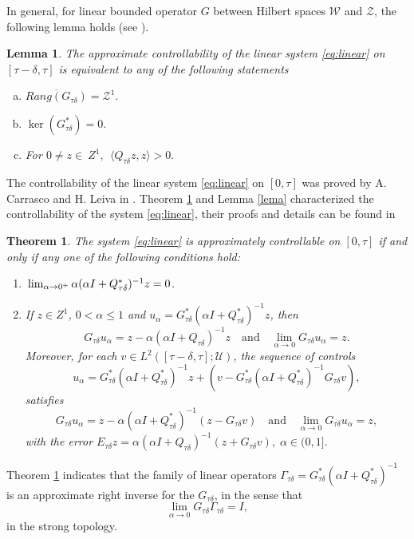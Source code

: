 \documentclass[11 pt]{amsart}
\newtheorem{teo}{\sc Theorem}[section]
\newtheorem{lemma}{\sc Lemma}[section]
\begin{document}
In general, for linear bounded operator $G$ between Hilbert spaces $\mathcal{W}$ and $\mathcal{Z}$, the following lemma holds (see \cite{Bashirov-Kerimov:1997aa,Bashirov-Mahmudov:1999aa, Leiva-Merentes:2013aa}).
\begin{lemma}
The approximate controllability of the linear system \eqref{eq:linear}  on $[\tau-\delta,\tau]$ is equivalent to  any of the following statements
\begin{enumerate}[(a)]
\item $\overline{Rang(G_{\tau\delta})}={\mathcal{Z}}^{1}.$
\item $\ker(G_{\tau\delta}^{*})={0}.$
\item For $0\neq z \in\ Z^{1},  \  \ {\langle { Q_{\tau\delta}z,z}\rangle}>0.$
\end{enumerate}
\end{lemma}

 The controllability of the linear system \eqref{eq:linear} on $[0,\tau]$ was proved  by A. Carrasco and H. Leiva in \cite{Carrasco-Leiva:2013aa}.  Theorem \ref{A1.5}   and Lemma \ref{lema} characterized the controllability of the system \eqref{eq:linear}, their proofs and details can be found in \cite{Bashirov-Kerimov:1997aa,Bashirov-Mahmudov:1999aa, Curtain-Pritchard:1978aa, Curtain-Zwart:1995aa, Leiva-Merentes:2013aa}

 \begin{teo}\label{A1.5} The system \eqref{eq:linear} is approximately
controllable on $[0,\tau]$ if and only if any one of the following conditions hold:
\begin{enumerate}
\item ${\displaystyle}\lim_{\alpha \to 0^+} \alpha(\alpha I +Q_{\tau\delta}^{*})^{-1}z =0 $.\\
\item If $z\in Z^{1}$,  $0<\alpha \leq 1$ and $u_{\alpha}=G_{\tau\delta}^{*}(\alpha I +
Q_{\tau\delta}^{*})^{-1}z$, then
$$
G_{\tau\delta}u_{\alpha}=z - \alpha(\alpha I+ Q_{\tau\delta})^{-1}z \quad \mbox{and} \quad
\displaystyle\lim_{\alpha\to 0}G_{\tau\delta}u_{\alpha}=z.
$$
Moreover, for each $v\in L^{2}([\tau-\delta,\tau];{\mathcal{U}})$, the sequence of controls
$$
u_{\alpha}=G_{\tau\delta}^{*}(\alpha I +
Q_{\tau\delta}^{*})^{-1}z + (v-G_{\tau\delta}^{*}(\alpha I +
Q_{\tau\delta}^{*})^{-1}G_{\tau\delta}v),
$$
satisfies
$$
G_{\tau\delta}u_{\alpha}=z-\alpha(\alpha I +
Q_{\tau\delta}^{*})^{-1}(z-G_{\tau\delta}v)
\quad
\mbox{and}
\quad
\displaystyle\lim_{\alpha\to 0}G_{\tau\delta}u_{\alpha}=z,
$$
with the error $E_{\tau\delta}z=\alpha(\alpha I +
Q_{\tau\delta})^{-1}(z+G_{\tau\delta}v),\;\alpha\in(0,1].
$
\end{enumerate}
\end{teo}
Theorem \ref{A1.5} indicates that the family of linear operators $
\Gamma_{\tau\delta}=G_{\tau\delta}^{*}(\alpha I +
Q_{\tau\delta}^{*})^{-1}
$
is an approximate right inverse for the $G_{\tau\delta}$, in
the sense that
$$
\displaystyle\lim_{\alpha\longrightarrow 0}G_{\tau\delta}\Gamma_{\tau\delta}=I,
$$
in the strong topology.
\end{document}
